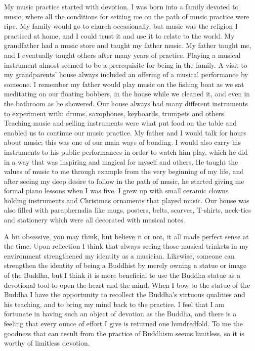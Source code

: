 My music practice started with devotion. I was born into a family
devoted to music, where all the conditions for setting me on the path of
music practice were ripe. My family would go to church occasionally, but
music was the religion I practised at home, and I could trust it and use
it to relate to the world. My grandfather had a music store and taught
my father music. My father taught me, and I eventually taught others
after many years of practice. Playing a musical instrument almost seemed
to be a prerequisite for being in the family. A visit to my
grandparents' house always included an offering of a musical performance
by someone. I remember my father would play music on the fishing boat as
we sat meditating on our floating bobbers, in the house while we cleaned
it, and even in the bathroom as he showered. Our house always had many
different instruments to experiment with: drums, saxophones, keyboards, 
trumpets and others. Teaching music and selling instruments were what
put food on the table and enabled us to continue our music practice. My
father and I would talk for hours about music; this was one of our main
ways of bonding. I would also carry his instruments to his public
performances in order to watch him play, which he did in a way that was
inspiring and magical for myself and others. He taught the values of
music to me through example from the very beginning of my life, and
after seeing my deep desire to follow in the path of music, he started
giving me formal piano lessons when I was five. I grew up with small
ceramic clowns holding instruments and Christmas ornaments that played
music. Our house was also filled with paraphernalia like mugs, posters, 
belts, scarves, T-shirts, neck-ties and stationery which were all
decorated with musical notes. 

A bit obsessive, you may think, but believe it or not, it all made
perfect sense at the time. Upon reflection I think that always seeing
those musical trinkets in my environment strengthened my identity as a
musician. Likewise, someone can strengthen the identity of being a
Buddhist by merely owning a statue or image of the Buddha, but I think
it is more beneficial to use the Buddha statue as a devotional tool to
open the heart and the mind. When I bow to the statue of the Buddha I
have the opportunity to recollect the Buddha's virtuous qualities and
his teaching, and to bring my mind back to the practice. I feel that I
am fortunate in having such an object of devotion as the Buddha, and
there is a feeling that every ounce of effort I give is returned one
hundredfold. To me the goodness that can result from the practice of
Buddhism seems limitless, so it is worthy of limitless devotion. 

